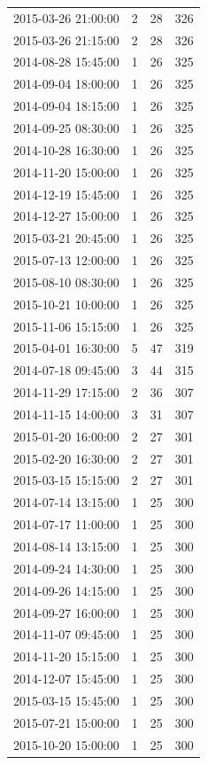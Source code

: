 \begin{tabular}{lrrr}
2015-03-26 21:00:00 & 2 & 28 & 326 \\
2015-03-26 21:15:00 & 2 & 28 & 326 \\
2014-08-28 15:45:00 & 1 & 26 & 325 \\
2014-09-04 18:00:00 & 1 & 26 & 325 \\
2014-09-04 18:15:00 & 1 & 26 & 325 \\
2014-09-25 08:30:00 & 1 & 26 & 325 \\
2014-10-28 16:30:00 & 1 & 26 & 325 \\
2014-11-20 15:00:00 & 1 & 26 & 325 \\
2014-12-19 15:45:00 & 1 & 26 & 325 \\
2014-12-27 15:00:00 & 1 & 26 & 325 \\
2015-03-21 20:45:00 & 1 & 26 & 325 \\
2015-07-13 12:00:00 & 1 & 26 & 325 \\
2015-08-10 08:30:00 & 1 & 26 & 325 \\
2015-10-21 10:00:00 & 1 & 26 & 325 \\
2015-11-06 15:15:00 & 1 & 26 & 325 \\
2015-04-01 16:30:00 & 5 & 47 & 319 \\
2014-07-18 09:45:00 & 3 & 44 & 315 \\
2014-11-29 17:15:00 & 2 & 36 & 307 \\
2014-11-15 14:00:00 & 3 & 31 & 307 \\
2015-01-20 16:00:00 & 2 & 27 & 301 \\
2015-02-20 16:30:00 & 2 & 27 & 301 \\
2015-03-15 15:15:00 & 2 & 27 & 301 \\
2014-07-14 13:15:00 & 1 & 25 & 300 \\
2014-07-17 11:00:00 & 1 & 25 & 300 \\
2014-08-14 13:15:00 & 1 & 25 & 300 \\
2014-09-24 14:30:00 & 1 & 25 & 300 \\
2014-09-26 14:15:00 & 1 & 25 & 300 \\
2014-09-27 16:00:00 & 1 & 25 & 300 \\
2014-11-07 09:45:00 & 1 & 25 & 300 \\
2014-11-20 15:15:00 & 1 & 25 & 300 \\
2014-12-07 15:45:00 & 1 & 25 & 300 \\
2015-03-15 15:45:00 & 1 & 25 & 300 \\
2015-07-21 15:00:00 & 1 & 25 & 300 \\
2015-10-20 15:00:00 & 1 & 25 & 300 \\

\end{tabular}
